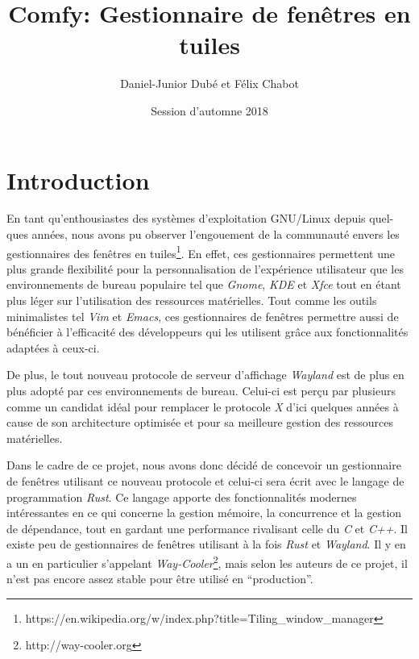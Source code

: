 \documentclass[titlepage]{article}
\title{Comfy: Gestionnaire de fenêtres en tuiles}
\author{Daniel-Junior Dubé et Félix Chabot}
\date{Session d'automne 2018}
\begin{document}
\maketitle

\renewcommand{\contentsname}{Table des matières}
\tableofcontents
\newpage

\section{Introduction}
\par
\bigskip
En tant qu'enthousiastes des systèmes d'exploitation GNU/Linux depuis quel-ques années, nous avons pu observer l’engouement de la communauté
envers les gestionnaires des fenêtres en
tuiles\footnote{https://en.wikipedia.org/w/index.php?title=Tiling\_window\_manager}.
En effet, ces gestionnaires permettent une plus grande flexibilité pour la
personnalisation de l’expérience utilisateur que les environnements de bureau
populaire tel que \textit{Gnome}, \textit{KDE} et \textit{Xfce} tout en étant
plus léger sur l’utilisation des ressources matérielles. Tout comme les outils
minimalistes tel \textit{Vim} et \textit{Emacs}, ces gestionnaires de fenêtres
permettre aussi de bénéficier à l’efficacité des développeurs qui les utilisent
grâce aux fonctionnalités adaptées à ceux-ci.

\par
\bigskip
De plus, le tout nouveau protocole de serveur d'affichage \textit{Wayland} est de plus en plus adopté par
ces environnements de bureau. Celui-ci est perçu par plusieurs comme un candidat idéal pour remplacer le protocole \textit{X}
d'ici quelques années à cause de son architecture optimisée et pour sa
meilleure gestion des ressources matérielles.

\par
\bigskip
Dans le cadre de ce projet, nous avons donc décidé de concevoir un gestionnaire de fenêtres utilisant ce
nouveau protocole et celui-ci sera écrit avec le langage de programmation
\textit{Rust}. Ce langage apporte des fonctionnalités modernes
intéressantes en ce qui concerne la gestion mémoire, la concurrence et la gestion de dépendance, tout en
gardant une performance rivalisant celle du \textit{C} et \textit{C++}. Il
existe peu de gestionnaires de fenêtres utilisant à la fois \textit{Rust} et
\textit{Wayland}. Il y en a un en particulier s’appelant
\textit{Way-Cooler}\footnote{http://way-cooler.org}, mais selon les auteurs de
ce projet, il n’est pas encore assez stable pour être utilisé en “production”.
\end{document}
